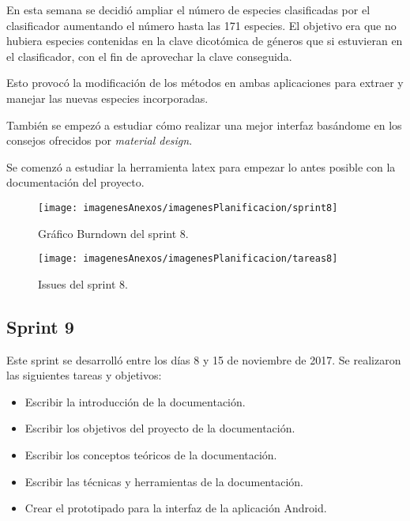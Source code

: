 En esta semana se decidió ampliar el número de especies clasificadas por el clasificador aumentando el número hasta las 171 especies. El objetivo era que no hubiera especies contenidas en la clave dicotómica de géneros que si estuvieran en el clasificador, con el fin de aprovechar la clave conseguida.

Esto provocó la modificación de los métodos en ambas aplicaciones para extraer y manejar las nuevas especies incorporadas.

También se empezó a estudiar cómo realizar una mejor interfaz basándome en los consejos ofrecidos por \textit{material design}.

Se comenzó a estudiar la herramienta latex para empezar lo antes posible con la documentación del proyecto.

\begin{figure}[h]
    \begin{center}%
        \begin{center}%
          \texttt{[image: imagenesAnexos/imagenesPlanificacion/sprint8]}%
          \caption{Gráfico Burndown del sprint 8.}%
          \label{figSprint8}%
        \end{center}%
  	\end{center}%
\end{figure}%

\begin{figure}[h]
    \begin{center}%
        \begin{center}%
          \texttt{[image: imagenesAnexos/imagenesPlanificacion/tareas8]}%
          \caption{Issues del sprint 8.}%
          \label{figTareas8}%
        \end{center}%
  	\end{center}%
\end{figure}%

\newpage

\subsection{Sprint 9}

Este sprint se desarrolló entre los días 8 y 15 de noviembre de 2017. Se realizaron las siguientes tareas y objetivos:

\begin{itemize}
	\item Escribir la introducción de la documentación.
	\item Escribir los objetivos del proyecto de la documentación.
	\item Escribir los conceptos teóricos de la documentación.
	\item Escribir las técnicas y herramientas de la documentación.
	\item Crear el prototipado para la interfaz de la aplicación Android.
\end{itemize}

